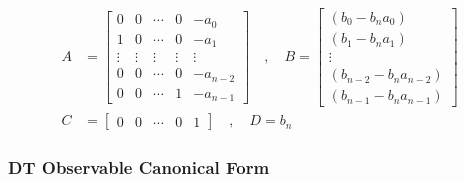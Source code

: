 \documentclass[twoside]{article}
\begin{document}
\begin{align*}
A &= \left[ \begin{array}{ccccc} 0 & 0 & \cdots & 0 & -a_0 
              \\ 1 & 0 & \cdots & 0 & -a_1 
\\ \vdots & \vdots & \vdots & \vdots & \vdots
\\ 0 & 0 & \cdots & 0 & -a_{n-2}
    \\ 0 & 0 & \cdots & 1 & -a_{n-1} \end{array} \right]
\quad , \quad 
B = \left[ \begin{array}{c} (b_0 - b_n a_0)  \\ (b_1 - b_n
             a_1 ) \\ \vdots \\ (b_{n-2} - b_n a_{n-2} ) \\   (b_{n-1} - b_n
             a_{n-1}) 
\end{array} \right]
\\ C &= \left[ \begin{array}{ccccc} 0 & 0 & \cdots &  0 & 1 \end{array} \right]
\quad , \quad
D = b_n
\end{align*}

\subsubsection{DT Observable Canonical Form}
\end{document}
